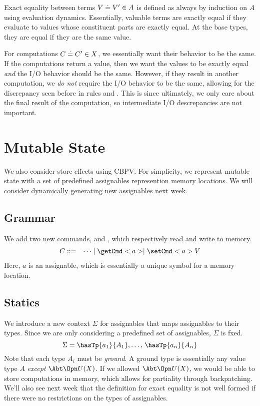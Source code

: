 \documentclass[letterpaper]{article}
\begin{document}
Exact equality between terms $V \doteq V' \in A$ is defined as always by induction on $A$ using evaluation dynamics. Essentially, valuable terms are exactly equal if they evaluate to values whose constituent parts are exactly equal. At the base types, they are equal if they are the same value.

For computations $C \doteq C' \in X$, we essentially want their behavior to be the same. If the computations return a value, then we want the values to be exactly equal \emph{and} the I/O behavior should be the same. However, if they result in another computation, we \emph{do not} require the I/O behavior to be the same, allowing for the discrepancy seen before in rules  and . This is since ultimately, we only care about the final result of the computation, so intermediate I/O descrepancies are not important.

\section{Mutable State}
We also consider store effects using CBPV. For simplicity, we represent mutable state with a set of predefined assignables represention memory locations. We will consider dynamically generating new assignables next week.

\subsection{Grammar}
We add two new commands,  and , which respectively read and write to memory.
\[
  \begin{array}{rl}
    C ::= & \cdots \mid \getCmd<a> \mid \setCmd<a>{V}
  \end{array}
\]
Here, $a$ is an assignable, which is essentially a unique symbol for a memory location.

\subsection{Statics}
We introduce a new context $\Sigma$ for assignables that maps assignables to their types. Since we are only considering a predefined set of assignables, $\Sigma$ is fxed.
\[
  \Sigma = \hasTp{a_1}{A_1}, \ldots,\, \hasTp{a_n}{A_n}
\]
Note that each type $A_i$ must be \emph{ground}. A ground type is essentially any value type $A$ \emph{except} $\thunkTy*{X}$. If we allowed $\thunkTy*{X}$, we would be able to store computations in memory, which allows for partiality through backpatching. We'll also see next week that the definition for exact equality is not well formed if there were no restrictions on the types of assignables.
\end{document}
